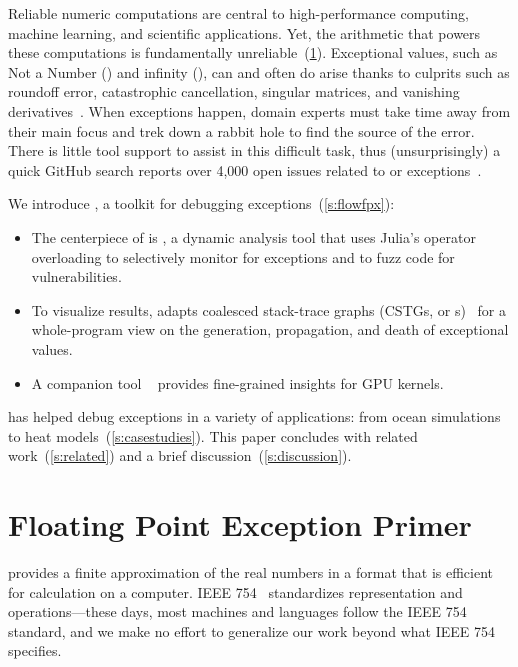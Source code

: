 \documentclass{juliacon}
\begin{document}
Reliable numeric computations are central to high-performance computing,
machine learning, and scientific applications.
Yet, the \fp{} arithmetic that powers these computations is fundamentally
unreliable~(\cref{s:background}).
Exceptional values, such as Not a Number (\Nan{}) and infinity (\Inf{}),
can and often do arise thanks to culprits such as roundoff error,
catastrophic cancellation, singular matrices, and vanishing
derivatives~\cite{sdjmrstp-pc-2022,ddghlllprr-correctness-2022,gllprt-correctness-2021,fpchecker-reports,llg-soap-2022,bllmg-xloop-2022}.
When exceptions happen, domain experts must take time away from their main
focus and trek down a rabbit hole to find the source of the error.
There is little tool support to assist in this difficult task,
thus (unsurprisingly) a quick GitHub search reports over 4,000 open issues
related to \NaN{} or \Inf{} exceptions~\cite{github-issues}.

We introduce \FlowFPX{}, a toolkit for debugging
\fp{} exceptions~(\cref{s:flowfpx}):
\begin{itemize}
  \item
    The centerpiece of \FlowFPX{} is \FT{}, a dynamic analysis tool that uses
    Julia's operator overloading to selectively monitor for exceptions and to
    fuzz code for vulnerabilities.
  \item
    To visualize results, \FT{} adapts coalesced stack-trace graphs 
    (CSTGs, or \CSTG{}s)~\cite{humphreySystematicDebuggingMethods2014} for a whole-program view on the generation,
    propagation, and death of exceptional values.
  \item A companion tool \GPUFPX{}~\cite{llsflg-hpdc-2023} provides fine-grained insights for GPU kernels.
\end{itemize}
%
\FlowFPX{} has helped debug exceptions in a variety
of applications: from ocean simulations to heat models~(\cref{s:casestudies}).
This paper concludes with related work~(\cref{s:related}) and a
brief discussion~(\cref{s:discussion}).

\section{Floating Point Exception Primer}
\label{s:background}

\Fp{} provides a finite approximation of the real numbers in a format that is efficient for calculation on a computer.
IEEE 754~\cite{IEEEStandardBinary1985} standardizes \fp{} representation and operations---these days, most machines and languages follow the IEEE 754 standard, and we make no effort to generalize our work beyond what IEEE 754 specifies.
\end{document}
